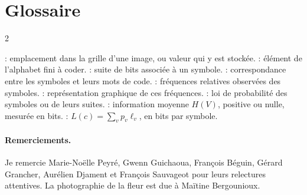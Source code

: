 \ifdefined\StandaloneChapter
\par\noindent\begin{minipage}{\linewidth}
\section*{Glossaire}
\begin{multicols}{2}\small\raggedright
\begin{rs}
 : emplacement dans la grille d'une image, ou valeur qui y est stockée.
 : élément de l'alphabet fini à coder.
 : suite de bits associée à un symbole.
 : correspondance entre les symboles et leurs mots de code.
 : fréquences relatives observées des symboles.
 : représentation graphique de ces fréquences.
 : loi de probabilité des symboles ou de leurs suites.
 : information moyenne $H(V)$, positive ou nulle, mesurée en bits.
 : $L(c)=\sum_vp_v\ell_v$, en bits par symbole.
\end{rs}
\end{multicols}
\end{minipage}\par
\fi

\ifdefined\StandaloneChapter
\paragraph*{Remerciements.}
Je remercie Marie-Noëlle Peyré, Gwenn Guichaoua, François Béguin, Gérard Grancher, Aurélien Djament et François Sauvageot pour leurs relectures attentives. La photographie de la fleur est due à Maïtine Bergounioux.
\fi
